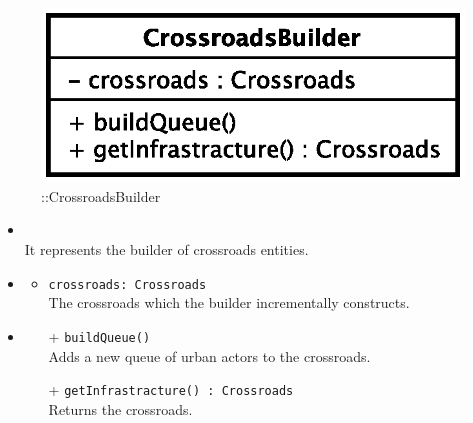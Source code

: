 \begin{figure}[h]
\centering
\includegraphics[scale=0.6,keepaspectratio]{images/solution/app/backend/crossroads_builder.eps}
\caption{\pReactiveBuild::CrossroadsBuilder}
\label{fig:sd-app-crossroads_builder}
\end{figure}
\FloatBarrier
\begin{itemize}
  \item \textbf{\descr} \\
    It represents the builder of crossroads entities. 
    \item \textbf{\attrs}
  \begin{itemize}
    \item \texttt{crossroads: Crossroads} \\
The crossroads which the builder incrementally constructs.
  \end{itemize}
  \item \textbf{\ops}
  \begin{itemize} 
    \item[+] \texttt{buildQueue()} \\
Adds a new queue of urban actors to the crossroads.
    \item[+] \texttt{getInfrastracture() : Crossroads} \\
Returns the crossroads.
  \end{itemize}
\end{itemize}
